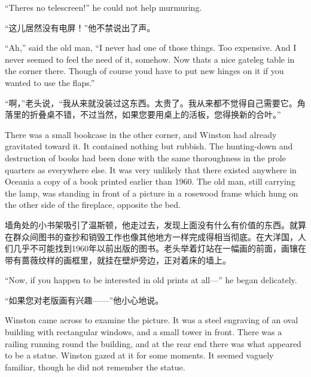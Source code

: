 \begin{paracol}{2}
\switchcolumn*

``There\textquotesingle s no telescreen!'' he could not help murmuring.

\switchcolumn

``这儿居然没有电屏！''他不禁说出了声。

\switchcolumn*

``Ah,'' said the old man, ``I never had one of those things. Too expensive.
And I never seemed to feel the need of it, somehow. Now
that\textquotesingle s a nice gateleg table in the corner there. Though
of course you\textquotesingle d have to put new hinges on it if you
wanted to use the flaps.''

\switchcolumn

``啊，''老头说，``我从来就没装过这东西。太贵了。我从来都不觉得自己需要它。角落里的折叠桌不错，不过当然，如果您要用桌上的活板，您得换新的合叶。''

\switchcolumn*

There was a small bookcase in the other corner, and Winston had already
gravitated toward it. It contained nothing but rubbish. The hunting-down
and destruction of books had been done with the same thoroughness in the
prole quarters as everywhere else. It was very unlikely that there
existed anywhere in Oceania a copy of a book printed earlier than 1960.
The old man, still carrying the lamp, was standing in front of a picture
in a rosewood frame which hung on the other side of the fireplace,
opposite the bed.

\switchcolumn

墙角处的小书架吸引了温斯顿，他走过去，发现上面没有什么有价值的东西。就算在群众间图书的查抄和销毁工作也像其他地方一样完成得相当彻底。在大洋国，人们几乎不可能找到1960年以前出版的图书。老头举着灯站在一幅画的前面，画镶在带有蔷薇纹样的画框里，就挂在壁炉旁边，正对着床的墙上。

\switchcolumn*

``Now, if you happen to be interested in old prints at all---'' he began
delicately.

\switchcolumn

``如果您对老版画有兴趣——''他小心地说。

\switchcolumn*

Winston came across to examine the picture. It was a steel engraving of
an oval building with rectangular windows, and a small tower in front.
There was a railing running round the building, and at the rear end
there was what appeared to be a statue. Winston gazed at it for some
moments. It seemed vaguely familiar, though he did not remember the
statue.


\end{paracol}
